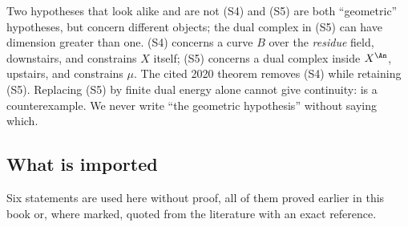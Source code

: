 \newpage
\begin{warning}{Two hypotheses that look alike and are not}
\textup{(S4)} and \textup{(S5)} are both ``geometric'' hypotheses, but concern different objects; the dual complex in \textup{(S5)}
can have dimension greater than one.  \textup{(S4)} concerns a curve $B$ over the
\emph{residue} field, downstairs, and constrains $X$ itself;
\textup{(S5)} concerns a dual complex inside $X^{\An}$, upstairs, and
constrains $\mu$.  The cited 2020 theorem removes \textup{(S4)} while retaining
\textup{(S5)}.  Replacing \textup{(S5)} by finite dual energy alone cannot
give continuity:  is a counterexample.
We never write ``the geometric hypothesis'' without
saying which.
\end{warning}

\subsection{What is imported}
\label{sec:ch29-imported}

Six statements are used here without proof, all of them proved earlier in
this book or, where marked, quoted from the literature with an exact
reference.

